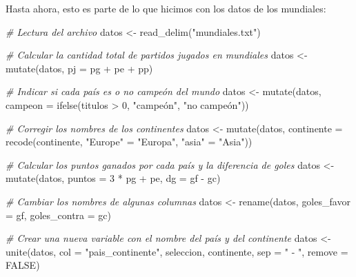 \documentclass[
]{book}
\newenvironment{Shaded}{\begin{snugshade}}{\end{snugshade}}
\newcommand{\AttributeTok}[1]{\textcolor[rgb]{0.77,0.63,0.00}{#1}}
\newcommand{\CommentTok}[1]{\textcolor[rgb]{0.56,0.35,0.01}{\textit{#1}}}
\newcommand{\ConstantTok}[1]{\textcolor[rgb]{0.00,0.00,0.00}{#1}}
\newcommand{\DecValTok}[1]{\textcolor[rgb]{0.00,0.00,0.81}{#1}}
\newcommand{\FunctionTok}[1]{\textcolor[rgb]{0.00,0.00,0.00}{#1}}
\newcommand{\NormalTok}[1]{#1}
\newcommand{\OtherTok}[1]{\textcolor[rgb]{0.56,0.35,0.01}{#1}}
\newcommand{\SpecialCharTok}[1]{\textcolor[rgb]{0.00,0.00,0.00}{#1}}
\newcommand{\StringTok}[1]{\textcolor[rgb]{0.31,0.60,0.02}{#1}}
\begin{document}
Hasta ahora, esto es parte de lo que hicimos con los datos de los mundiales:

\begin{Shaded}
\begin{Highlighting}[]
\CommentTok{\# Lectura del archivo}
\NormalTok{datos }\OtherTok{\textless{}{-}} \FunctionTok{read\_delim}\NormalTok{(}\StringTok{"mundiales.txt"}\NormalTok{)}

\CommentTok{\# Calcular la cantidad total de partidos jugados en mundiales}
\NormalTok{datos }\OtherTok{\textless{}{-}} \FunctionTok{mutate}\NormalTok{(datos, }\AttributeTok{pj =}\NormalTok{ pg }\SpecialCharTok{+}\NormalTok{ pe }\SpecialCharTok{+}\NormalTok{ pp)}

\CommentTok{\# Indicar si cada país es o no campeón del mundo}
\NormalTok{datos }\OtherTok{\textless{}{-}} \FunctionTok{mutate}\NormalTok{(datos, }\AttributeTok{campeon =} \FunctionTok{ifelse}\NormalTok{(titulos }\SpecialCharTok{\textgreater{}} \DecValTok{0}\NormalTok{, }\StringTok{"campeón"}\NormalTok{, }\StringTok{"no campeón"}\NormalTok{))}

\CommentTok{\# Corregir los nombres de los continentes}
\NormalTok{datos }\OtherTok{\textless{}{-}} \FunctionTok{mutate}\NormalTok{(datos, }\AttributeTok{continente =} \FunctionTok{recode}\NormalTok{(continente, }\StringTok{"Europe"} \OtherTok{=} \StringTok{"Europa"}\NormalTok{, }\StringTok{"asia"} \OtherTok{=} \StringTok{"Asia"}\NormalTok{))}

\CommentTok{\# Calcular los puntos ganados por cada país y la diferencia de goles}
\NormalTok{datos }\OtherTok{\textless{}{-}} \FunctionTok{mutate}\NormalTok{(datos, }\AttributeTok{puntos =} \DecValTok{3} \SpecialCharTok{*}\NormalTok{ pg }\SpecialCharTok{+}\NormalTok{ pe, }\AttributeTok{dg =}\NormalTok{ gf }\SpecialCharTok{{-}}\NormalTok{ gc)}

\CommentTok{\# Cambiar los nombres de algunas columnas}
\NormalTok{datos }\OtherTok{\textless{}{-}} \FunctionTok{rename}\NormalTok{(datos, }\AttributeTok{goles\_favor =}\NormalTok{ gf, }\AttributeTok{goles\_contra =}\NormalTok{ gc)}

\CommentTok{\# Crear una nueva variable con el nombre del país y del continente}
\NormalTok{datos }\OtherTok{\textless{}{-}} \FunctionTok{unite}\NormalTok{(datos, }\AttributeTok{col =} \StringTok{"pais\_continente"}\NormalTok{, seleccion, continente, }\AttributeTok{sep =} \StringTok{" {-} "}\NormalTok{, }\AttributeTok{remove =} \ConstantTok{FALSE}\NormalTok{)}
\end{Highlighting}
\end{Shaded}
\end{document}
